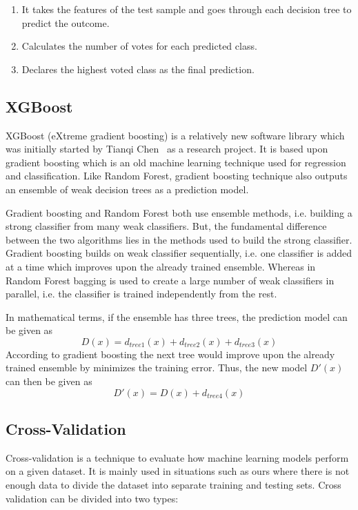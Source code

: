 \begin{enumerate}
	\item It takes the features of the test sample and goes through each decision tree to predict the outcome.
	\item Calculates the number of votes for each predicted class.
	\item Declares the highest voted class as the final prediction.
\end{enumerate}

\subsection{XGBoost}

XGBoost (eXtreme gradient boosting) is a relatively new software library which was initially started by Tianqi Chen~\cite{ChenG16, XGBWiki} as a research project. It is based upon gradient boosting which is an old machine learning technique used for regression and classification. Like Random Forest, gradient boosting technique also outputs an ensemble of weak decision trees as a prediction model. 

Gradient boosting and Random Forest both use ensemble methods, i.e. building a strong classifier from many weak classifiers. But, the fundamental difference between the two algorithms lies in the methods used to build the strong classifier. Gradient boosting builds on weak classifier sequentially, i.e. one classifier is added at a time which improves upon the already trained ensemble. Whereas in Random Forest bagging is used to create a large number of weak classifiers in parallel, i.e. the classifier is trained independently from the rest.

In mathematical terms, if the ensemble has three trees, the prediction model can be given as
$$
	D(x) = d_{tree 1}(x) + d_{tree 2}(x) + d_{tree 3}(x)
$$
According to gradient boosting the next tree would improve upon the already trained ensemble by minimizes the training error. Thus, the new model $D'(x)$ can then be given as
$$
D'(x) = D(x) + d_{tree 4}(x)
$$

\subsection{Cross-Validation}

Cross-validation is a technique to evaluate how machine learning models perform on a given dataset. It is mainly used in situations such as ours where there is not enough data to divide the dataset into separate training and testing sets. Cross validation can be divided into two types:

